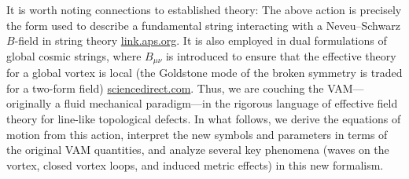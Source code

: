 \documentclass[12pt]{article}
\begin{document}
It is worth noting connections to established theory: The above action is precisely the form used to describe a fundamental string interacting with a Neveu--Schwarz $B$-field in string theory%
\href{https://link.aps.org/doi/10.1103/PhysRevD.9.2273#:~:text=Classical%20direct%20interstring%20action,2273}{link.aps.org}.
It is also employed in dual formulations of global cosmic strings, where $B_{\mu\nu}$ is introduced to ensure that the effective theory for a global vortex is local (the Goldstone mode of the broken symmetry is traded for a two-form field)%
\href{https://www.sciencedirect.com/science/article/abs/pii/0370269373905935#:~:text=Construction%20of%20Pomeron%20states%20in,View%20full}{sciencedirect.com}.
Thus, we are couching the VAM---originally a fluid mechanical paradigm---in the rigorous language of effective field theory for line-like topological defects. In what follows, we derive the equations of motion from this action, interpret the new symbols and parameters in terms of the original VAM quantities, and analyze several key phenomena (waves on the vortex, closed vortex loops, and induced metric effects) in this new formalism.
\end{document}
